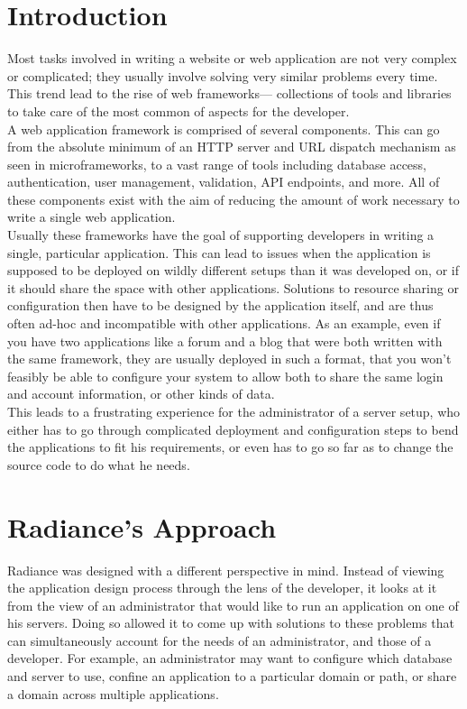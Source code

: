 \documentclass{sig-alternate}
\begin{document}
\printccsdesc

\newpage

\section{Introduction}
Most tasks involved in writing a website or web application are not very complex or complicated; they usually involve solving very similar problems every time. This trend lead to the rise of web frameworks--- collections of tools and libraries to take care of the most common of aspects for the developer. \\

A web application framework is comprised of several components. This can go from the absolute minimum of an HTTP server and URL dispatch mechanism as seen in microframeworks\cite{microframeworks}, to a vast range of tools including database access, authentication, user management, validation, API endpoints, and more. All of these components exist with the aim of reducing the amount of work necessary to write a single web application. \\

Usually these frameworks have the goal of supporting developers in writing a single, particular application. This can lead to issues when the application is supposed to be deployed on wildly different setups than it was developed on, or if it should share the space with other applications. Solutions to resource sharing or configuration then have to be designed by the application itself, and are thus often ad-hoc and incompatible with other applications. As an example, even if you have two applications like a forum and a blog that were both written with the same framework, they are usually deployed in such a format, that you won't feasibly be able to configure your system to allow both to share the same login and account information, or other kinds of data. \\

This leads to a frustrating experience for the administrator of a server setup, who either has to go through complicated deployment and configuration steps to bend the applications to fit his requirements, or even has to go so far as to change the source code to do what he needs.

\section{Radiance's Approach}
Radiance was designed with a different perspective in mind. Instead of viewing the application design process through the lens of the developer, it looks at it from the view of an administrator that would like to run an application on one of his servers. Doing so allowed it to come up with solutions to these problems that can simultaneously account for the needs of an administrator, and those of a developer. For example, an administrator may want to configure which database and server to use, confine an application to a particular domain or path, or share a domain across multiple applications. \\
\end{document}
